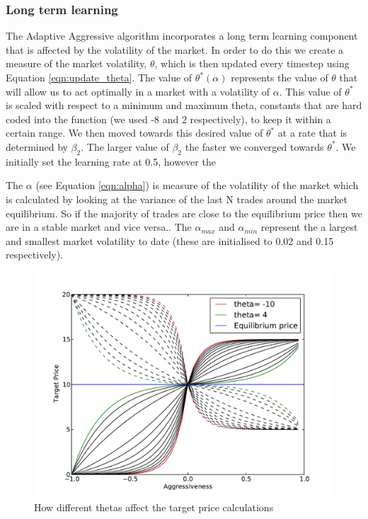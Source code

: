 \documentclass[preprint]{acm_proc_article-sp} %
\begin{document}
\subsubsection{Long term learning} \label{sec:AA_long_term_learning}
The Adaptive Aggressive algorithm incorporates a long term learning component
that is affected by the volatility of the market. In order to do this we create
a measure of the market volatility, $\theta$, which is then updated every
timestep using Equation \ref{eqn:update_theta}. The value of $\theta^*(\alpha)$
represents the value of $\theta$ that will allow us to act optimally in a
market with a volatility of $\alpha$. This value of $\theta^*$ is scaled with
respect to a minimum and maximum theta, constants that are hard coded into the
function (we used -8 and 2 respectively), to keep it within a certain range.
We then moved towards this desired value of $\theta^*$ at a rate that is
determined by $\beta_2$. The larger value of $\beta_2$ the faster we converged
towards $\theta^*$. We initially set the learning rate at 0.5, however the 

The $\alpha$ (see Equation
\ref{eqn:alpha}) is measure of the volatility of the market which is calculated
by looking at the variance of the last N trades around the market equilibrium.
So if the majority of trades are close to the equilibrium price then we are in
a stable market and vice versa.. The $\alpha_{max}$ and $\alpha_{min}$
represent the a largest and smallest market volatility to date (these are
initialised to 0.02 and 0.15 respectively).

\begin{figure}
  \centering
  \includegraphics[width=\columnwidth]{graphs_and_stats/graph_thetas.pdf}
  \caption{How different thetas affect the target price calculations}
  \label{fig:theta}
\end{figure}
\end{document}

